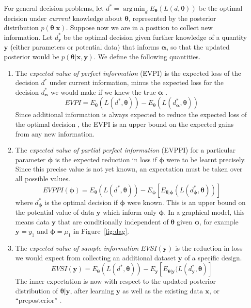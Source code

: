 \documentclass[12pt]{article}\usepackage[]{graphicx}\usepackage[]{color}
\DeclareMathOperator*{\argmin}{arg\,min}
\newcommand{\y}{\mathbf{y}}
\newcommand{\x}{\mathbf{x}}
\begin{document}
For general decision problems, let $d^* = \argmin_d E_{\bm\theta}(L(d,\bm\theta))$ be the optimal decision under \emph{current} knowledge about
$\bm\theta$, represented by the posterior distribution $p(\bm\theta|\x)$.   
Suppose now we are in a position to collect new information.  
Let $d^*_{\y}$ be the optimal decision given further
knowledge of a quantity $\y$ (either parameters or potential data) that 
informs $\bm\alpha$, so that the
updated posterior would be $p(\bm\theta|\x,\y)$.  We define the following quantities.
\begin{enumerate}
\item The \emph{expected value of perfect information} (EVPI) is
  the expected loss of the decision $d^*$ under current
  information, minus the expected loss for the decision $d^*_{\bm\alpha}$
  we would make if we knew the true $\bm\alpha$ \citep{raiffa:schlaifer}.
  \[
    EVPI = E_{\bm\theta} (L(d^*,\bm\theta)) - E_{\bm\theta} (L(d^*_{\bm\alpha},\bm\theta))
  \]
  Since additional information is always expected to reduce the
  expected loss of the optimal decision
  \citep[][]{parmigiani2009decision}, the EVPI is an upper bound on
  the expected gains from any new information.

\item The \emph{expected value of partial perfect information} (EVPPI)
  for a particular parameter $\bm\phi$ is the expected reduction in loss
  if $\bm\phi$ were to be learnt precisely.  Since this precise value is not yet known,  an expectation must be taken over all possible values.
  \begin{equation}
    \label{eq:evppi}
    EVPPI(\bm\phi) = E_{\bm\theta} (L(d^*,\bm\theta)) - E_{\bm\phi} [  E_{\bm\theta|\bm\phi} (L(d^*_{\bm\phi},\bm\theta)) ]
  \end{equation}
  where $d^*_{\bm\phi}$ is the optimal decision if $\bm\phi$ were known.  This is an upper bound on the potential value of data $\y$
  which inform only $\bm\phi$.  In a graphical model, this means data
  $\y$ that are conditionally independent of $\bm\theta$
  given $\bm\phi$, for example $\y=y_1$ and $\bm\phi = \mu_1$ in
  Figure~\ref{fig:dag}.
  

\item The \emph{expected value of
  sample information} $EVSI(\y)$ is the reduction in loss we would
expect from collecting an additional dataset $\y$ of a specific design.
\begin{equation}
  \label{eq:evsi}
  EVSI(\y)  =  E_{\bm\theta}(L(d^*, \bm\theta)) - E_{\y} \left[  E_{\bm\theta|\y} (L(d^*_{\y}, \bm\theta) \right]
\end{equation}
The inner expectation is now with respect to the updated posterior
distribution of $\bm\theta|\y$, after learning $\y$ as well as the
existing data $\x$, or ``preposterior'' \citep{berger2013statistical}.


\end{enumerate}
\end{document}
